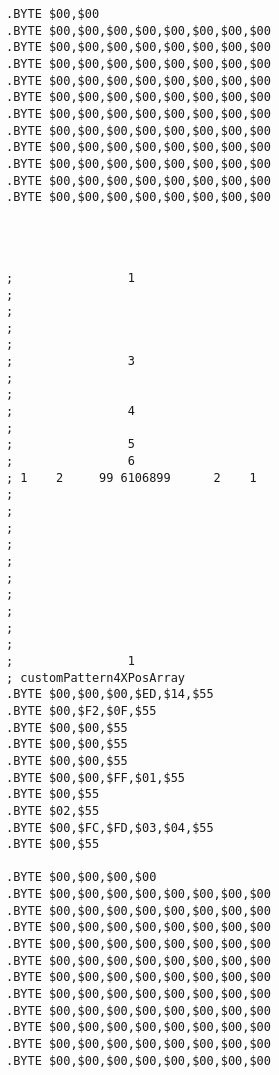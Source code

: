 \begin{minipage}[b]{0.33\linewidth}
\begin{lrbox}{\mybox}
\begin{lstlisting}[basicstyle=\ttfamily\tiny]
.BYTE $00,$00
.BYTE $00,$00,$00,$00,$00,$00,$00,$00
.BYTE $00,$00,$00,$00,$00,$00,$00,$00
.BYTE $00,$00,$00,$00,$00,$00,$00,$00
.BYTE $00,$00,$00,$00,$00,$00,$00,$00
.BYTE $00,$00,$00,$00,$00,$00,$00,$00
.BYTE $00,$00,$00,$00,$00,$00,$00,$00
.BYTE $00,$00,$00,$00,$00,$00,$00,$00
.BYTE $00,$00,$00,$00,$00,$00,$00,$00
.BYTE $00,$00,$00,$00,$00,$00,$00,$00
.BYTE $00,$00,$00,$00,$00,$00,$00,$00
.BYTE $00,$00,$00,$00,$00,$00,$00,$00
\end{lstlisting}
\end{lrbox}%
\scalebox{0.8}{\usebox{\mybox}}
\end{minipage}
\begin{minipage}[b]{0.33\linewidth}
\begin{lrbox}{\mybox}%
\begin{lstlisting}[basicstyle=\ttfamily\tiny]



;                1                    
;                                     
;                                     
;                                     
;                                     
;                3                    
;                                     
;                                     
;                4                    
;                                     
;                5                    
;                6                    
; 1    2     99 6106899      2    1
;                                     
;                                     
;                                     
;                                     
;                                     
;                                     
;                                     
;                                     
;                                     
;                                     
;                1                    
; customPattern4XPosArray
.BYTE $00,$00,$00,$ED,$14,$55
.BYTE $00,$F2,$0F,$55
.BYTE $00,$00,$55
.BYTE $00,$00,$55
.BYTE $00,$00,$55
.BYTE $00,$00,$FF,$01,$55
.BYTE $00,$55
.BYTE $02,$55
.BYTE $00,$FC,$FD,$03,$04,$55
.BYTE $00,$55

.BYTE $00,$00,$00,$00
.BYTE $00,$00,$00,$00,$00,$00,$00,$00
.BYTE $00,$00,$00,$00,$00,$00,$00,$00
.BYTE $00,$00,$00,$00,$00,$00,$00,$00
.BYTE $00,$00,$00,$00,$00,$00,$00,$00
.BYTE $00,$00,$00,$00,$00,$00,$00,$00
.BYTE $00,$00,$00,$00,$00,$00,$00,$00
.BYTE $00,$00,$00,$00,$00,$00,$00,$00
.BYTE $00,$00,$00,$00,$00,$00,$00,$00
.BYTE $00,$00,$00,$00,$00,$00,$00,$00
.BYTE $00,$00,$00,$00,$00,$00,$00,$00
.BYTE $00,$00,$00,$00,$00,$00,$00,$00


\end{lstlisting}
\end{lrbox}
\end{minipage}
